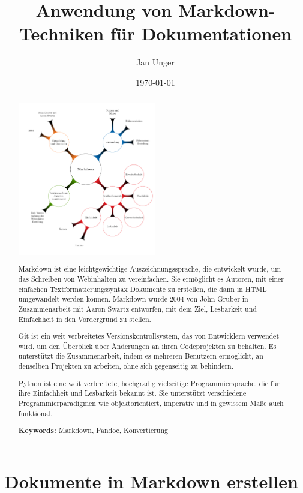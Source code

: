\documentclass{vorlage-design-main}
\title{Anwendung von Markdown-Techniken für Dokumentationen}
\author{Jan Unger}
\date{\today}
\begin{document}
\maketitle

\begin{abstract}
\includegraphics[width=0.5\textwidth]{images/Mindmap-Markdown.pdf}

Markdown ist eine leichtgewichtige Auszeichnungssprache, die entwickelt
wurde, um das Schreiben von Webinhalten zu vereinfachen. Sie ermöglicht
es Autoren, mit einer einfachen Textformatierungssyntax Dokumente zu
erstellen, die dann in HTML umgewandelt werden können. Markdown wurde
2004 von John Gruber in Zusammenarbeit mit Aaron Swartz entworfen, mit
dem Ziel, Lesbarkeit und Einfachheit in den Vordergrund zu stellen.

Git ist ein weit verbreitetes Versionskontrollsystem, das von
Entwicklern verwendet wird, um den Überblick über Änderungen an ihren
Codeprojekten zu behalten. Es unterstützt die Zusammenarbeit, indem es
mehreren Benutzern ermöglicht, an denselben Projekten zu arbeiten, ohne
sich gegenseitig zu behindern.

Python ist eine weit verbreitete, hochgradig vielseitige
Programmiersprache, die für ihre Einfachheit und Lesbarkeit bekannt ist.
Sie unterstützt verschiedene Programmierparadigmen wie objektorientiert,
imperativ und in gewissem Maße auch funktional.

\textbf{Keywords:} Markdown, Pandoc, Konvertierung
\end{abstract}

\section{Dokumente in Markdown
erstellen}\label{dokumente-in-markdown-erstellen}
\end{document}
